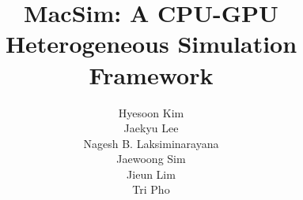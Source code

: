 \documentclass[11pt, letterpaper]{article}
\begin{document}
\title{MacSim: A CPU-GPU Heterogeneous Simulation Framework}

\author{Hyesoon Kim\\
Jaekyu Lee\\
Nagesh B. Laksiminarayana\\
Jaewoong Sim\\
Jieun Lim\\
Tri Pho}

\maketitle
\thispagestyle{empty}

\clearpage

\tableofcontents

\clearpage





%











%
%
\clearpage




\end{document}
